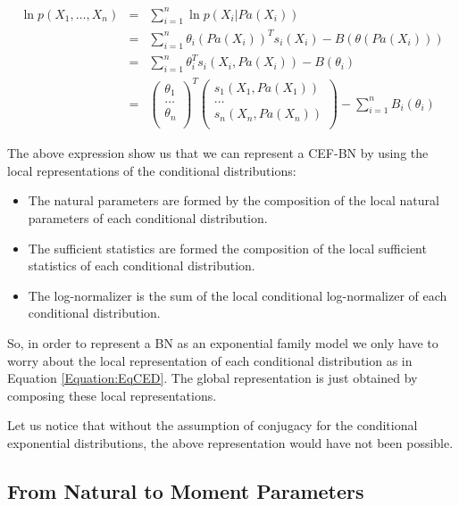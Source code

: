 \documentclass[11pt, oneside]{article}   	%
\numberwithin{figure}{section}
\numberwithin{equation}{section}
\numberwithin{table}{section}
\theoremstyle{definition}
\begin{document}
\begin{eqnarray}
\label{Equation:CEFSS}
\ln p(X_1,\ldots, X_n) &=& \sum_{i=1}^n \ln p(X_i|Pa(X_i))\nonumber\\
&=& \sum_{i=1}^n \theta_i(Pa(X_i))^T s_i(X_i) - B(\theta(Pa(X_i)))\nonumber\\
&=& \sum_{i=1}^n \theta_i^T s_i(X_i, Pa(X_i)) - B(\theta_i)\nonumber\\
&=&
\begin{pmatrix}
\theta_1\\
\ldots \\
\theta_n\\
\end{pmatrix}^T
\begin{pmatrix}
s_1(X_1,Pa(X_1)) \\
\ldots \\
s_n(X_n,Pa(X_n)) \\
\end{pmatrix}
- \sum_{i=1}^n B_i(\theta_i)
\end{eqnarray}

The above expression show us that we can represent a CEF-BN by using the local representations of the conditional distributions:

\begin{itemize}
\item The natural parameters are formed by the composition of the local natural parameters of each conditional distribution. 
\item The sufficient statistics are formed the composition of the local sufficient statistics of each conditional distribution. 
\item The log-normalizer is the sum of the local conditional log-normalizer of each conditional distribution. 
\end{itemize}

So, in order to represent a BN as an exponential family model we only have to worry about the local representation of each conditional distribution as in Equation \ref{Equation:EqCED}. The global representation is just obtained by composing these local representations. 

Let us notice that without the assumption of conjugacy  for the conditional exponential distributions, the above representation would have not been possible. 

\subsection{From Natural to Moment Parameters}
\label{Section:CEFBN:NaturalToMoment}
\end{document}
